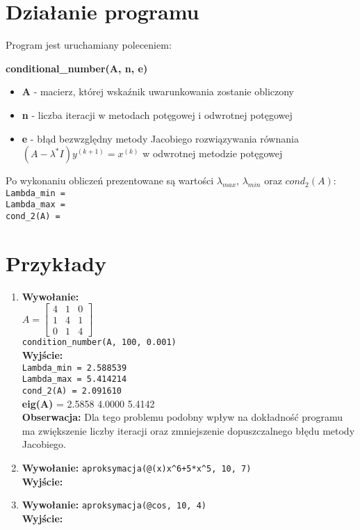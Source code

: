 \documentclass[]{article}
\begin{document}
\section{Działanie programu}

Program jest uruchamiany poleceniem:
\begin{center}
	\textbf{conditional\_number(A, n, e)}
\end{center} 
\begin{itemize}
	\item \textbf{A} - macierz, której wskaźnik uwarunkowania zostanie obliczony
	\item \textbf{n} - liczba iteracji w metodach potęgowej i odwrotnej potęgowej
	\item \textbf{e} - błąd bezwzględny metody Jacobiego rozwiązywania równania \\$(A - \lambda^{*}I)y^{(k+1)} = x^{(k)}$ w odwrotnej metodzie potęgowej
\end{itemize}
Po wykonaniu obliczeń prezentowane są wartości $\lambda_{max}$, $\lambda_{min}$ oraz $cond_2(A)$:\\
\verb|Lambda_min = |\\
\verb|Lambda_max = |\\
\verb|cond_2(A) = |
\section{Przykłady}
\begin{enumerate}
\item \textbf{Wywołanie:}\\
$A = \begin{bmatrix}
4 & 1 & 0\\
1 & 4 & 1\\
0 & 1 & 4
\end{bmatrix}$\\
\verb|condition_number(A, 100, 0.001)|
\\\textbf{Wyjście:}\\
\verb|Lambda_min = 2.588539|\\
\verb|Lambda_max = 5.414214|\\
\verb|cond_2(A) = 2.091610|\\
\textbf{eig(A)} =  2.5858 4.0000 5.4142\\
\textbf{Obserwacja:} Dla tego problemu podobny wpływ na dokładność programu ma zwiększenie liczby iteracji oraz zmniejszenie dopuszczalnego błędu metody Jacobiego.
\item \textbf{Wywołanie:} \verb|aproksymacja(@(x)x^6+5*x^5, 10, 7)|
\\\textbf{Wyjście:}
    
\item \textbf{Wywołanie:} \verb|aproksymacja(@cos, 10, 4)|
\\\textbf{Wyjście:}\\

\end{enumerate}
\end{document}
